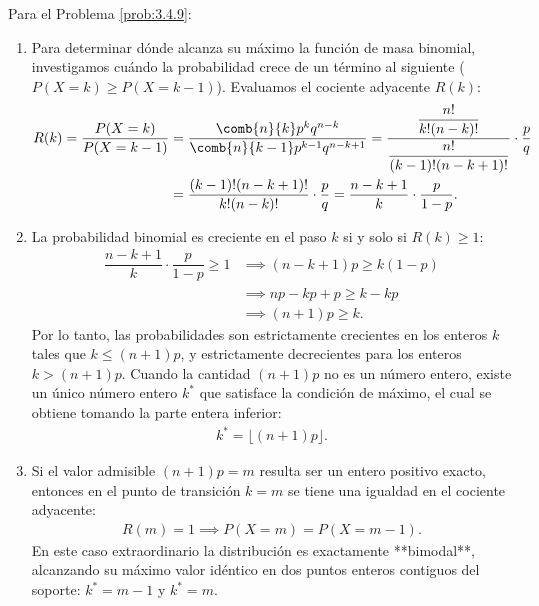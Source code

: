 \begin{solucion}
	\label{sol:3.4.9}
	Para el Problema \ref{prob:3.4.9}:
	\begin{enumerate}
		\item Para determinar dónde alcanza su máximo la función de masa binomial, investigamos cuándo la probabilidad crece de un término al siguiente ($P(X=k) \ge P(X=k-1)$). Evaluamos el cociente adyacente $R(k)$:
		\begin{align*}
			R(k) = \dfrac{P(X=k)}{P(X=k-1)} &= \dfrac{\comb{n}{k} p^k q^{n-k}}{\comb{n}{k-1} p^{k-1} q^{n-k+1}} = \dfrac{\dfrac{n!}{k!(n-k)!}}{\dfrac{n!}{(k-1)!(n-k+1)!}} \cdot \dfrac{p}{q} \\
			&= \dfrac{(k-1)!(n-k+1)!}{k!(n-k)!} \cdot \dfrac{p}{q} = \dfrac{n-k+1}{k} \cdot \dfrac{p}{1-p}.
		\end{align*}
		\item La probabilidad binomial es creciente en el paso $k$ si y solo si $R(k) \ge 1$:
		\begin{align*}
			\dfrac{n-k+1}{k} \cdot \dfrac{p}{1-p} \ge 1 &\implies (n-k+1)p \ge k(1-p) \\
			&\implies np - kp + p \ge k - kp \\
			&\implies (n+1)p \ge k.
		\end{align*}
		Por lo tanto, las probabilidades son estrictamente crecientes en los enteros $k$ tales que $k \le (n+1)p$, y estrictamente decrecientes para los enteros $k > (n+1)p$. Cuando la cantidad $(n+1)p$ no es un número entero, existe un único número entero $k^*$ que satisface la condición de máximo, el cual se obtiene tomando la parte entera inferior:
		\begin{align*}
			k^* = \lfloor (n+1)p \rfloor.
		\end{align*}
		\item Si el valor admisible $(n+1)p = m$ resulta ser un entero positivo exacto, entonces en el punto de transición $k = m$ se tiene una igualdad en el cociente adyacente:
		\begin{align*}
			R(m) = 1 \implies P(X = m) = P(X = m-1).
		\end{align*}
		En este caso extraordinario la distribución es exactamente **bimodal**, alcanzando su máximo valor idéntico en dos puntos enteros contiguos del soporte: $k^* = m-1$ y $k^* = m$.
	\end{enumerate}
\end{solucion}

